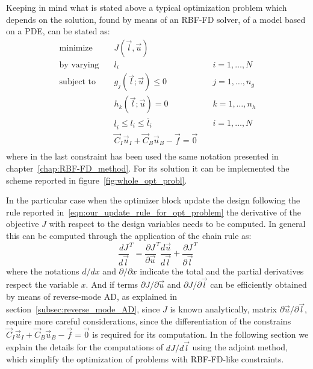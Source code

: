 Keeping in mind what is stated above a typical optimization problem which depends on the solution, found by means of an RBF-FD solver, of a model based on a PDE, can be stated as: 
\begin{equation}
	\label{eqn:general_design_opt_problem_with_RBF-FD_model}
	\begin{aligned}
		\text{minimize}   & \quad J(\vec{l}, \vec{u})														   \\
		\text{by varying} & \quad l_i  & \quad i=1, \dots, N    \\
		\text{subject to} & \quad g_j(\vec{l}; \vec{u})	\le 0							  & \quad j=1, \dots, n_g  \\
		& \quad h_k(\vec{l}; \vec{u}) = 0								  & \quad k=1, \dots, n_h  \\
		& \quad \underline{l}_i \le l_i \le \overline{l}_i  & \quad i=1, \dots, N \\
		& \quad \vec{C}_I\vec{u}_I + \vec{C}_B\vec{u}_B - \vec{f} = \vec{0}  \\
	\end{aligned}
\end{equation}
where in the last constraint has been used the same notation presented in chapter~\ref{chap:RBF-FD_method}.
For its solution it can be implemented the scheme reported in figure~\ref{fig:whole_opt_probl}.

In the particular case when the optimizer block update the design following the rule reported in~\eqref{eqn:our_update_rule_for_opt_problem} the derivative of the objective $J$ with respect to the design variables needs to be computed. In general this can be computed through the application of the chain rule as:
\begin{equation}
	\label{eqn:generic_gradient_design_opt}
	\frac{dJ}{d\vec{l}}^T = \frac{\partial J}{\partial \vec{u}}^T \frac{d\vec{u}}{d\vec{l}} + \frac{\partial J}{\partial \vec{l}}^T
\end{equation}
where the notations $d/dx$ and $\partial/\partial x$ indicate the total and the partial derivatives respect the variable $x$. And if terms $\partial J / \partial \vec{u}$ and $\partial J / \partial \vec{l}$ can be efficiently obtained by means of reverse-mode AD, as explained in section~\vref{subsec:reverse_mode_AD}, since $J$ is known analytically, matrix $\partial \vec{u} / \partial \vec{l}$, require more careful considerations, since the differentiation of the constrains $\vec{C}_I\vec{u}_I + \vec{C}_B\vec{u}_B - \vec{f} = \vec{0}$ is required for its computation. In the following section we explain the details for the computations of $dJ/d\vec{l}$ using the adjoint method, which simplify the optimization of problems with RBF-FD-like constraints.



